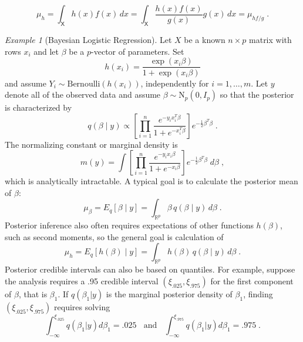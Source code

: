 \documentclass[12pt]{article}
\theoremstyle{plain}
\theoremstyle{definition}
\theoremstyle{remark}
\newtheorem{example}{Example}[section]
\newcommand{\sX}{\mathsf{X}}
\newcommand{\real}{\mathbb{R}}
\begin{document}
\[
\mu_{h} = \int_{\sX} h(x) f(x) \, dx = \int_{\sX} \frac{h(x)
  f(x)}{g(x)} g(x) \, dx = \mu_{hf/g} \; .
\]

\begin{example}[Bayesian Logistic Regression]
  Let $X$ be a known $n \times p$ matrix with rows $x_{i}$ and let
  $\beta$ be a $p$-vector of parameters. Set
\[
h(x_{i}) = \frac{\exp(x_{i} \beta)}{1+\exp(x_{i} \beta)}
\]
and assume $Y_{i} \sim \text{Bernoulli}(h(x_{i}))$, independently for
$i=1, \ldots, m$. Let $y$ denote all of the observed data and assume
$\beta \sim \text{N}_{p}(0, I_{p})$ so that the posterior is
characterized by
\[
q(\beta \mid y) \propto \left[ \prod_{i=1}^{n} \frac{e^{-y_i x_i^T
      \beta}}{1+ e^{- x_i^T \beta}}\right] e^{- \frac{1}{2} \beta^T
  \beta} \; .
\]
The normalizing constant or marginal density is
\[
m(y) = \int \left[ \prod_{i=1}^{n} \frac{e^{-y_i x_i
      \beta}}{1+ e^{- x_i \beta}}\right] e^{- \frac{1}{2} \beta^T
  \beta} \; d\beta \; ,
\]
which is analytically intractable. A typical goal is to calculate the
posterior mean of $\beta$:
\[
\mu_{\beta} = E_q [\beta \mid  y] = \int_{\real^p} \beta \,q(\beta
\mid y)\,
d\beta \; .
\]
Posterior inference also often requires expectations of other
functions $h(\beta)$, such as second moments, so the general goal is
calculation of
\[
\mu_{h} =  E_q [h(\beta) \mid  y] = \int_{\real^p} h(\beta) \,q(\beta
\mid y)\,
d\beta \; .
\]
Posterior credible intervals can also be based on quantiles.  For
example, suppose the analysis requires a .95 credible interval $(\xi_{.025},
\xi_{.975})$ for the first component of $\beta$, that is $\beta_1$. If
$q(\beta_{1} | y)$ is the marginal posterior density of $\beta_{1}$,
finding $(\xi_{.025}, \xi_{.975})$ requires solving
$$
\int_{-\infty}^{\xi_{.025}} q(\beta_{1} | y) d \beta_{1} = .025 ~~~~
\text{and} ~~~~
\int_{-\infty}^{\xi_{.975}} q(\beta_{1} | y) d \beta_{1} = .975 \; .
$$
\end{example}
\end{document}
